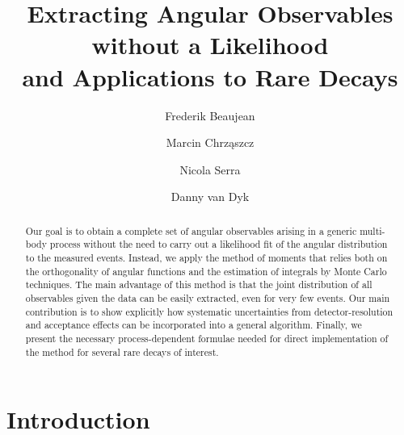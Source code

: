 \documentclass[aps,prd,reprint,nofootinbib,preprintnumbers]{revtex4}
\begin{document}
\allowdisplaybreaks

\title{Extracting Angular Observables without a Likelihood\\and Applications to Rare Decays}
\author{Frederik Beaujean}
\author{Marcin Chrz\k{a}szcz}
\author{Nicola Serra}
\author{Danny van Dyk}

\begin{abstract}
  Our goal is to obtain a complete set of angular observables
  arising in a generic multi-body process without the need to carry
  out a likelihood fit of the angular distribution to the measured
  events. Instead, we apply the method of moments that relies
  both on the orthogonality of angular functions and the estimation of
  integrals by Monte Carlo techniques. The main advantage of
  this method is that the joint distribution of all observables
  given the data can be easily extracted, even for very few
  events. Our main contribution is to show explicitly how systematic
  uncertainties from detector-resolution and acceptance effects can
  be incorporated into a general algorithm. Finally, we present the
  necessary process-dependent formulae needed for direct
  implementation of the method for several rare decays of
  interest.
\end{abstract}

\maketitle

\section{Introduction}
\label{sec:intro}
\end{document}
